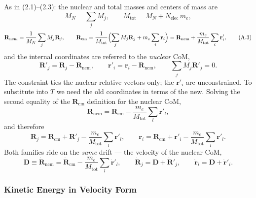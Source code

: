 As in (2.1)--(2.3): the nuclear and total masses and centers of mass are
\begin{equation}
M_N = \sum_j M_j ,\qquad M_{\mathrm{tot}} = M_N + N_{\mathrm{elec}}\,m_e , \tag{A.2}
\end{equation}
\begin{equation}
\mathbf R_{\mathrm{ncm}} = \frac{1}{M_N}\sum_j M_j \mathbf R_j ,\qquad
\mathbf R_{\mathrm{cm}} = \frac{1}{M_{\mathrm{tot}}}\Bigl(\sum_j M_j \mathbf R_j + m_e\sum_i \mathbf r_i\Bigr)
= \mathbf R_{\mathrm{ncm}} + \frac{m_e}{M_{\mathrm{tot}}}\sum_i \mathbf r'_i , \tag{A.3}
\end{equation}
and the internal coordinates are referred to the \emph{nuclear} CoM,
\begin{equation}
\mathbf R'_j = \mathbf R_j - \mathbf R_{\mathrm{ncm}} ,\qquad
\mathbf r'_i = \mathbf r_i - \mathbf R_{\mathrm{ncm}} ,\qquad
\sum_j M_j \mathbf R'_j = 0 . \tag{A.4}
\end{equation}
The constraint ties the nuclear relative vectors only; the $\mathbf r'_i$ are unconstrained. To substitute into $T$ we need the old coordinates in terms of the new. Solving the second equality of the $\mathbf R_{\mathrm{cm}}$ definition for the nuclear CoM,
\begin{equation}
\mathbf R_{\mathrm{ncm}} = \mathbf R_{\mathrm{cm}} - \frac{m_e}{M_{\mathrm{tot}}}\sum_l \mathbf r'_l , \tag{A.5}
\end{equation}
and therefore
\begin{equation}
\mathbf R_j = \mathbf R_{\mathrm{cm}} + \mathbf R'_j - \frac{m_e}{M_{\mathrm{tot}}}\sum_l \mathbf r'_l ,
\qquad
\mathbf r_i = \mathbf R_{\mathrm{cm}} + \mathbf r'_i - \frac{m_e}{M_{\mathrm{tot}}}\sum_l \mathbf r'_l . \tag{A.6}
\end{equation}
Both families ride on the \emph{same} drift --- the velocity of the nuclear CoM,
\begin{equation}
\mathbf D \equiv \dot{\mathbf R}_{\mathrm{ncm}} = \dot{\mathbf R}_{\mathrm{cm}} - \frac{m_e}{M_{\mathrm{tot}}}\sum_l \dot{\mathbf r}'_l ,
\qquad
\dot{\mathbf R}_j = \mathbf D + \dot{\mathbf R}'_j ,
\qquad
\dot{\mathbf r}_i = \mathbf D + \dot{\mathbf r}'_i . \tag{A.7}
\end{equation}

\subsubsection*{Kinetic Energy in Velocity Form}

